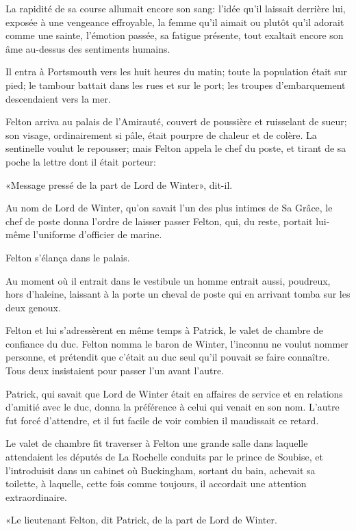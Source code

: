La rapidité de sa course allumait encore son sang: l'idée qu'il laissait derrière lui, exposée à une vengeance effroyable, la femme qu'il aimait ou plutôt qu'il adorait comme une sainte, l'émotion passée, sa fatigue présente, tout exaltait encore son âme au-dessus des sentiments humains. 

Il entra à Portsmouth vers les huit heures du matin; toute la population était sur pied; le tambour battait dans les rues et sur le port; les troupes d'embarquement descendaient vers la mer. 

Felton arriva au palais de l'Amirauté, couvert de poussière et ruisselant de sueur; son visage, ordinairement si pâle, était pourpre de chaleur et de colère. La sentinelle voulut le repousser; mais Felton appela le chef du poste, et tirant de sa poche la lettre dont il était porteur: 

«Message pressé de la part de Lord de Winter», dit-il. 

Au nom de Lord de Winter, qu'on savait l'un des plus intimes de Sa Grâce, le chef de poste donna l'ordre de laisser passer Felton, qui, du reste, portait lui-même l'uniforme d'officier de marine. 

Felton s'élança dans le palais. 

Au moment où il entrait dans le vestibule un homme entrait aussi, poudreux, hors d'haleine, laissant à la porte un cheval de poste qui en arrivant tomba sur les deux genoux. 

Felton et lui s'adressèrent en même temps à Patrick, le valet de chambre de confiance du duc. Felton nomma le baron de Winter, l'inconnu ne voulut nommer personne, et prétendit que c'était au duc seul qu'il pouvait se faire connaître. Tous deux insistaient pour passer l'un avant l'autre. 

Patrick, qui savait que Lord de Winter était en affaires de service et en relations d'amitié avec le duc, donna la préférence à celui qui venait en son nom. L'autre fut forcé d'attendre, et il fut facile de voir combien il maudissait ce retard. 

Le valet de chambre fit traverser à Felton une grande salle dans laquelle attendaient les députés de La Rochelle conduits par le prince de Soubise, et l'introduisit dans un cabinet où Buckingham, sortant du bain, achevait sa toilette, à laquelle, cette fois comme toujours, il accordait une attention extraordinaire. 

«Le lieutenant Felton, dit Patrick, de la part de Lord de Winter. 

